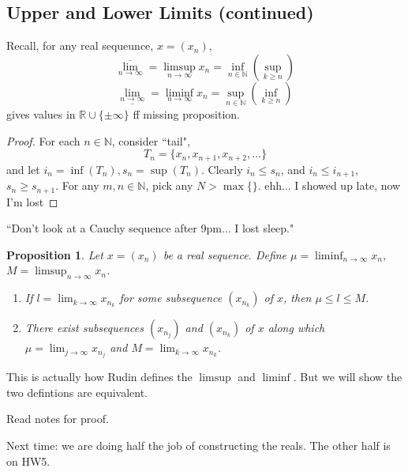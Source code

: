 \documentclass{article}
\theoremstyle{plain}
\newtheorem{proposition}{Proposition}
\theoremstyle{remark}
\newcommand{\N}{{\mathbb N}}
\newcommand{\R}{{\mathbb R}}
\begin{document}
\subsection{Upper and Lower Limits (continued)}
Recall, for any real sequeunce, $x = (x_n)$,
\[
	\overline{\lim_{n\to\infty}} = \limsup_{n \to \infty} x_n = \inf_{n\in\N}\left(\sup_{k\geq n}\right)
\]
\[
	\underline{\lim_{n\to\infty}} = \liminf_{n \to \infty} x_n = \sup_{n\in\N}\left(\inf_{k\geq n}\right)
\]
gives values in $\R \cup \{\pm\infty\}$
ff missing proposition.

\begin{proof}
	For each $n \in \N$, consider ``tail",
	\[
		T_n = \{x_n,x_{n+1},x_{n+2}, \dots \}
	\]
	and let $i_n = \inf(T_n), s_n = \sup(T_n)$.
	Clearly $i_n \leq s_n$, and $i_n \leq i_{n+1}$, $s_n \geq s_{n+1}$.
	For any $m,n\in\N$, pick any $N> \max\{\}$.
	ehh... I showed up late, now I'm lost
\end{proof}
``Don't look at a Cauchy sequence after 9pm... I lost sleep."


\begin{proposition}
	Let $x = (x_n)$ be a real sequence.
	Define $\mu = \liminf_{n\to\infty} x_n$, $M = \limsup_{n\to\infty} x_n$.
	\begin{enumerate}
		\item If $l = \lim_{k\to\infty}x_{n_k}$ for some subsequence $(x_{n_k})$ of $x$,
			then $\mu \leq l \leq M$.
		\item There exist subsequences $(x_{n_j})$ and $(x_{n_k})$
			of $x$ along which $\mu = \lim_{j\to\infty} x_{n_j}$ and $M = \lim_{k\to\infty} x_{n_k}$.
	\end{enumerate}
\end{proposition}
This is actually how Rudin defines the $\limsup$ and $\liminf$.
But we will show the two defintions are equivalent.

Read notes for proof.

Next time: we are doing half the job of constructing the reals. The other half is on HW5.
\end{document}
